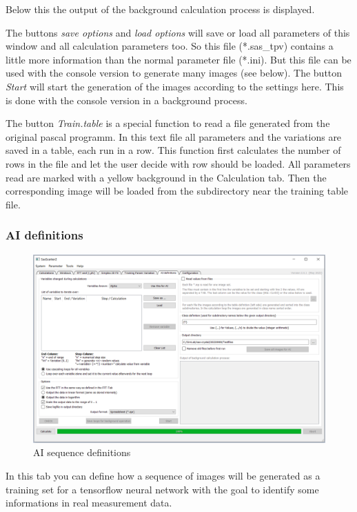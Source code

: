 \documentclass[11pt]{article} %
\begin{document}
Below this the output of the background calculation process is displayed.

The buttons {\it save options} and {\it load options} will save or load all parameters of this window and all calculation parameters too. So this file (*.sas\_tpv) contains a little more information than the normal parameter file (*.ini). But this file can be used with the console version to generate many images (see below).
The button {\it Start} will start the generation of the images according to the settings here. This is done with the console version in a background process.

The button {\it Train.table} is a special function to read a file generated from the original pascal programm. In this text file all parameters and the variations are saved in a table, each run in a row. This function first calculates the number of rows in the file and let the user decide with row should be loaded. All parameters read are marked with a yellow background in the Calculation tab. Then the corresponding image will be loaded from the  subdirectory near the training table file.



\subsubsection{AI definitions}
\begin{figure}[H]
 \centering
 \includegraphics[width=\textwidth]{gui-aidef.png}
 \caption{AI sequence definitions}
\end{figure}

In this tab you can define how a sequence of images will be generated as a training set for a tensorflow neural network with the goal to identify some informations in real measurement data.
\end{document}
